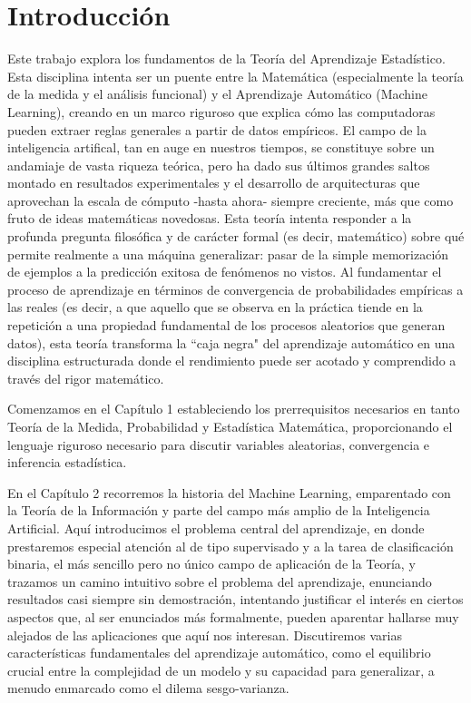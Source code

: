 \documentclass{report}
\begin{document}
\hypersetup{pageanchor=true}
\chapter*{Introducción}
Este trabajo explora los fundamentos de la Teoría del Aprendizaje Estadístico. Esta disciplina intenta ser un puente entre la Matemática (especialmente la teoría de la medida
y el análisis funcional) y el Aprendizaje Automático (Machine Learning), creando en un marco riguroso que explica cómo las computadoras pueden extraer reglas generales a partir
de datos empíricos. El campo de la inteligencia artifical, tan en auge en nuestros tiempos, se constituye sobre un andamiaje
de vasta riqueza teórica, pero ha dado sus últimos grandes saltos montado en resultados experimentales y el desarrollo de arquitecturas
que aprovechan la escala de cómputo -hasta ahora- siempre creciente, más que como fruto de ideas matemáticas novedosas. Esta teoría intenta
responder a la profunda pregunta filosófica y de carácter formal (es decir, matemático) sobre qué permite realmente a una máquina generalizar: pasar
de la simple memorización de ejemplos a la predicción exitosa de fenómenos no vistos. Al fundamentar el proceso de
aprendizaje en términos de convergencia de probabilidades empíricas a las reales (es decir, a que aquello que se observa en la práctica
tiende en la repetición a una propiedad fundamental de los procesos aleatorios que generan datos), esta teoría transforma la ``caja negra" del aprendizaje automático
en una disciplina estructurada donde el rendimiento puede ser acotado y comprendido a través del rigor matemático.


Comenzamos en el Capítulo 1 estableciendo los prerrequisitos necesarios en tanto Teoría de la Medida, Probabilidad y Estadística Matemática, proporcionando
el lenguaje riguroso necesario para discutir variables aleatorias, convergencia e inferencia estadística.

En el Capítulo 2 recorremos la historia del Machine Learning, emparentado con la Teoría de la Información y parte del campo
más amplio de la Inteligencia Artificial. Aquí introducimos el problema central del aprendizaje, en donde prestaremos especial atención al de tipo supervisado y a la tarea de clasificación binaria, el
más sencillo pero no único campo de aplicación de la Teoría, y trazamos un camino intuitivo sobre el problema del aprendizaje,
enunciando resultados casi siempre sin demostración, intentando justificar el interés en ciertos aspectos que, al ser enunciados más
formalmente, pueden aparentar hallarse muy alejados de las aplicaciones que aquí nos interesan.
Discutiremos varias características fundamentales del aprendizaje automático, como el equilibrio crucial entre la complejidad de un modelo
y su capacidad para generalizar, a menudo enmarcado como el dilema sesgo-varianza.
\end{document}
